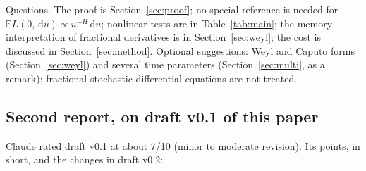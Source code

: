 \documentclass[11pt]{article}
\theoremstyle{remark}
\theoremstyle{definition}
\newcommand{\E}{\mathbb{E}}
\newcommand{\dd}{\,\mathrm{d}}
\begin{document}
Questions. The proof is Section~\ref{sec:proof}; no special reference is needed for $\E L(0,\dd u)\propto u^{-H}\dd u$; nonlinear tests are in Table~\ref{tab:main}; the memory interpretation of fractional derivatives is in Section~\ref{sec:weyl}; the cost is discussed in Section~\ref{sec:method}. Optional suggestions: Weyl and Caputo forms (Section~\ref{sec:weyl}) and several time parameters (Section~\ref{sec:multi}, as a remark); fractional stochastic differential equations are not treated.

\subsection{Second report, on draft v0.1 of this paper}\label{app:referee2}
Claude rated draft v0.1 at about 7/10 (minor to moderate revision). Its points, in short, and the changes in draft v0.2:
\end{document}
